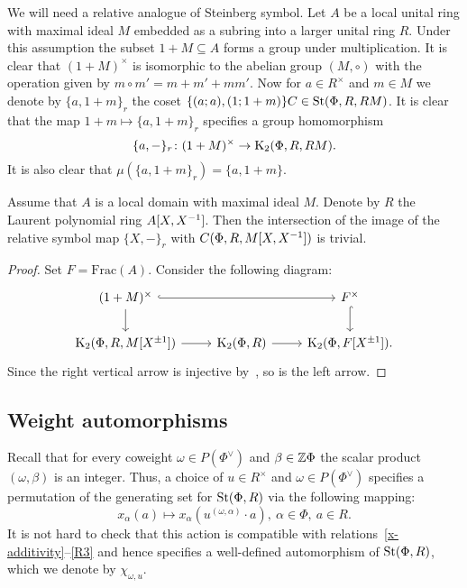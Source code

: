 We will need a relative analogue of Steinberg symbol.
Let $A$ be a local unital ring with maximal ideal $M$ embedded as a subring into a larger unital ring $R$.
Under this assumption the subset $1+M \subseteq A$ forms a group under multiplication.
It is clear that $(1+M)^\times$ is isomorphic to the abelian group $(M, \circ)$ with the operation given by $m \circ m' = m + m' + mm'$.
Now for $a \in R^\times$ and $m \in M$ we denote by $\{a, 1+m\}_r$ the coset $\{(a; a), (1; 1+m)\}C \in \operatorname{St}(\Phi, R, RM)$.
It is clear that the map $1+m \mapsto \{a, 1+m\}_r$ specifies a group homomorphism
\begin{equation} \label{eq:relative-symbol} \{ a, -\}_r \colon (1+M)^\times \to \operatorname{K}_2(\Phi, R, RM). \end{equation}
It is also clear that $\mu(\{a, 1+m\}_r) = \{a, 1+m\}$.

\begin{lemma}\label{lem:symbols}
Assume that $A$ is a local domain with maximal ideal $M$.
Denote by $R$ the Laurent polynomial ring $A[X, X^{-1}]$.
Then the intersection of the image of the relative symbol map $\{X, -\}_r$ with $C(\Phi, R, M[X, X^{-1}])$ is trivial.
\end{lemma}
\begin{proof}
Set $F = \mathrm{Frac}(A)$.
Consider the following diagram:
\[\begin{tikzcd}
 (1+M)^\times \ar[hookrightarrow, rr] \ar[d] &  & F^\times \ar[hookrightarrow, d] \\
  \K_2(\Phi ,R, M[X^{\pm 1}]) \ar[r] & \K_2(\Phi, R) \ar[r] & \K_2(\Phi, F[X^{\pm 1}]).
\end{tikzcd}\]
Since the right vertical arrow is injective by~\cite[Lemma~2.2]{LS20}, so is the left arrow.
\end{proof}

\subsection{Weight automorphisms}\label{subsec:weight-automorphisms}
Recall that for every coweight $\omega \in P(\Phi^\vee)$ and $\beta \in \mathbb{Z} \Phi$ the scalar product $(\omega, \beta)$ is an integer.
Thus, a choice of $u \in R^\times$ and $\omega \in P(\Phi^\vee)$ specifies a permutation of the generating set for $\operatorname{St}(\Phi, R)$ via the following mapping:
\begin{equation*} x_\alpha(a) \mapsto x_\alpha(u^{(\omega, \alpha)} \cdot a),\ \alpha\in \Phi,\ a \in R. \end{equation*}
It is not hard to check that this action is compatible with relations~\eqref{x-additivity}--\eqref{R3} and hence specifies a well-defined automorphism of $\operatorname{St}(\Phi, R)$, which we denote by $\chi_{\omega, u}$.

